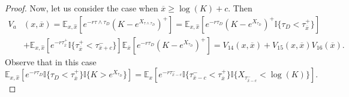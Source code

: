 \documentclass[10pt]{amsart}
\def\E{{\mathbb{E}}}
\def\Eq{{\mathbb{E}
		_{x,\hat{x}}}}
\def \R{{{\rm I{\!}\rm R}}}
\def \I{{\mathbb{I}}}
\def\E{{\mathbb E}} \def\PP{\mc P} \def\Z{{\mathbb Z}} \def\R{{\mathbb R}}
\begin{document}
\begin{proof}
			
			Now, let us consider the case when $\overline{x} \geq \log(K) + c$. Then
			\begin{align}\label{V_3}
				V_a&(x,\overline{x}) = \Eq \left[ e^{-r\tau\wedge\tau_D} \left( K - e^{X_{\tau\wedge\tau_D}} \right)^+ \right] =  \Eq\left[ e^{-r\tau_D} \left( K - e^{X_{\tau_D}} \right)^+ \I
				\{ \tau_D < \tau_{\overline{x}}^+ \} \right]
				\\
				\nonumber &+ \Eq\left[ e^{-r\tau_{\overline{x}}^+} \I
				\{\tau_{\overline{x}}^+ < \tau_{\overline{x}+c}^- \} \right]  \E_{\overline{x}}\left[ e^{-r\tau_D} \left( K - e^{X_{\tau_D}} \right)^+ \right] = V_{14}(x,\overline{x}) + V_{15}(x,\overline{x})V_{16}(\overline{x}).
			\end{align}
			Observe that in this case
			\begin{equation*}
				\Eq\left[ e^{-r\tau_D}
				\I \{ \tau_D < \tau_{\overline{x}}^+ \}
				\I \{ K > e^{X_{\tau_D}}\}
				\right] = \E_x \left[ e^{-r\tau_{\overline{x}-c}^- }
				\I \{ \tau_{\overline{x}-c}^- < \tau_{\overline{x}}^+ \}
				\I \{ X_{\tau_{\overline{x}-c}^- } < \log(K)\}
				\right].
			\end{equation*}
			

\end{proof}
\end{document}
